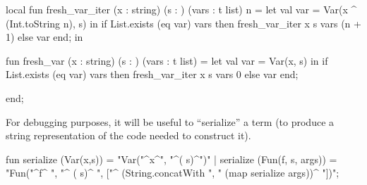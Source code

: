 \nwenddocs{}\endmoddef\nwstartdeflinemarkup{}\nwenddeflinemarkup
local
  fun fresh_var_iter (x : string) (s : ) (vars : t list) n = 
    let val var = Var(x ^ (Int.toString n), s)
    in if List.exists (eq var) vars
       then fresh_var_iter x s vars (n + 1)
       else var
    end;
in

fun fresh_var (x : string) (s : ) (vars : t list) = 
  let val var = Var(x, s)
  in if List.exists (eq var) vars
     then fresh_var_iter x s vars 0
     else var
  end;

end;
\eatline
{}\nwendcode{}\nwdocspar
\begin{node}
For debugging purposes, it will be useful to ``serialize'' a term (to
produce a string representation of the code needed to construct it).
\end{node}

\nwenddocs{}\endmoddef\nwstartdeflinemarkup{}\nwenddeflinemarkup
fun serialize (Var(x,s)) = "Var("^x^", "^( s)^")"
  | serialize (Fun(f, s, args)) = "Fun("^f^
                                  ", "^
                                  ( s)^
                                  ", ["^
                                  (String.concatWith ", " (map serialize args))^
                                  "])";
\eatline

\nwendcode{}%

